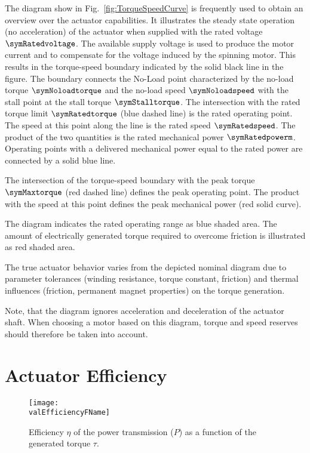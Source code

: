 \documentclass[a4paper,10pt]{cjtdsheet}      %
\begin{document}
\begin{multicols}{2}
The diagram show in Fig.~\ref{fig:TorqueSpeedCurve} is frequently used to obtain an overview over the actuator capabilities. It illustrates the steady state operation (no acceleration) of the actuator when supplied with the rated voltage $\symRatedvoltage$. The available supply voltage is used to produce the motor current and to compensate for the voltage induced by the spinning motor. This results in the torque-speed boundary indicated by the solid black line in the figure. The boundary connects the No-Load point characterized by the no-load torque $\symNoloadtorque$ and the no-load speed $\symNoloadspeed$ with the stall point at the stall torque $\symStalltorque$.  The intersection with the rated torque limit $\symRatedtorque$ (blue dashed line) is the rated operating point. The speed at this point along the line is the rated speed $\symRatedspeed$. The product of the two quantities is the rated mechanical power $\symRatedpowerm$. Operating points with a delivered mechanical power equal to the rated power are connected by a solid blue line. 

The intersection of the torque-speed boundary with the peak torque $\symMaxtorque$ (red dashed line) defines the peak operating point. The product with the speed at this point defines the peak mechanical power (red solid curve).

The diagram indicates the rated operating range as blue shaded area. The amount of electrically generated torque required to overcome friction is illustrated as red shaded area.

The true actuator behavior varies from the depicted nominal diagram due to parameter tolerances (winding resistance, torque constant, friction) and thermal influences (friction, permanent magnet properties) on the torque generation. 

Note, that the diagram ignores acceleration and deceleration of the actuator shaft. When choosing a motor based on this diagram, torque and speed reserves should therefore be taken into account.
%
\end{multicols}


\section{Actuator Efficiency}
\begin{figure}%
		\texttt{[image: \\valEfficiencyFName]}
		\caption{Efficiency $\eta$ of the power transmission ($P$) as a function of the generated torque $\tau$.}
	\label{fig:EfficiencyCurve}
\end{figure}
\end{document}

